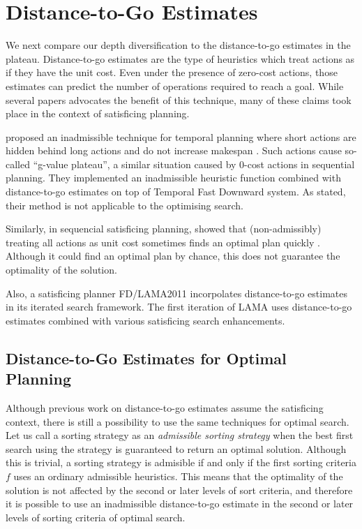 \clearpage
\section{Distance-to-Go Estimates}

\label{sec:distance-to-go}

We next compare our depth diversification to the distance-to-go
estimates in the plateau.  Distance-to-go estimates are the type of
heuristics which treat actions as if they have the unit cost. Even under
the presence of zero-cost actions, those estimates can predict the
number of operations required to reach a goal.
While several papers advocates the benefit of this technique, many of
these claims took place in the context of satisficing planning.

 proposed an inadmissible technique for temporal
planning where short actions are hidden behind long actions and do not
increase makespan \cite{benton2010g}. Such actions cause so-called
``g-value plateau'', a similar situation caused by 0-cost actions in
sequential planning.  They implemented an inadmissible heuristic
function combined with distance-to-go estimates on top of
Temporal Fast Downward system.  As stated, their method is not
applicable to the optimising search.
 
Similarly, in sequencial satisficing planning,
 showed that
(non-admissibly) treating all actions as unit cost sometimes finds an
optimal plan quickly \cite{cushing2010cost}.
Although it could find an optimal plan by chance, this does not
guarantee the optimality of the solution.
 
Also, a \sota satisficing planner FD/LAMA2011 incorpolates
distance-to-go estimates in its iterated search framework. The first
iteration of LAMA uses distance-to-go estimates combined with various
satisficing search enhancements.

\subsection{Distance-to-Go Estimates for Optimal Planning}

Although previous work on distance-to-go estimates assume the
satisficing context,
there is still a possibility to use the same techniques for optimal search.
Let us call a sorting strategy as an \emph{admissible sorting strategy}
when the best first search using the strategy is guaranteed to return an
optimal solution. Although this
is trivial, a sorting strategy is admisible if and only if the 
first sorting criteria $f$ uses an ordinary
admissible heuristics. 
This means that the optimality of the solution is not affected by the
second or later levels of sort criteria, and therefore
it is possible to use an inadmissible
distance-to-go estimate in the second or later levels of sorting criteria of optimal search.
 
